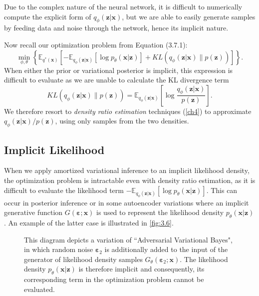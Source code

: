 \documentclass[honours,12pt, twoside]{unswthesis}
\newcommand{\E}{\mathbb{E}}
\numberwithin{equation}{section}
\theoremstyle{definition}
\begin{document}
Due to the complex nature of the neural network, it is difficult to numerically compute the explicit form of $q_\phi(\bm{z}|\bm{x})$, but we are able to easily generate samples by feeding data and noise through the network, hence its implicit nature.

Now recall our optimization problem from Equation (3.7.1):
\[\min_{\phi,\theta} \left\lbrace\mathbb{E}_{q^*(\bm{x})}\left[-\E_{q_\phi(\bm{z}|\bm{x})}[\log p_\theta(\bm{x}|\bm{z})]+KL(q_\phi(\bm{z}|\bm{x})\|p(\bm{z}))\right]\right\rbrace.\]
When either the prior or variational posterior is implicit, this expression is difficult to evaluate as we are unable to calculate the KL divergence term
\[KL(q_\phi(\bm{z}|\bm{x})\|p(\bm{z}))=\E_{q_\phi(\bm{z}|\bm{x})}\left[\log \frac{q_\phi(\bm{z}|\bm{x})}{p(\bm{z})}\right].\]
We therefore resort to \textit{density ratio estimation} techniques (\autoref{ch4}) to approximate $q_\phi(\bm{z}|\bm{x})/p(\bm{z})$, using only samples from the two densities.
\subsection{Implicit Likelihood}\label{sec:3.8.2}
When we apply amortized variational inference to an implicit likelihood density, the optimization problem is intractable even with density ratio estimation, as it is difficult to evaluate the likelihood term $-\E_{q_\phi(\bm{z}|\bm{x})}[\log p_\theta(\bm{x}|\bm{z})]$. This can occur in posterior inference or in some autoencoder variations where an implicit generative function $G(\bm{\varepsilon};\bm{x})$ is used to represent the likelihood density $p_\theta(\bm{x}|\bm{z})$ \citep{ali}. An example of the latter case is illustrated in \autoref{fig:3.6}.
\begin{figure}[h]
  \centering
   \caption{\small This diagram depicts a variation of ``Adversarial Variational Bayes", in which random noise $\bm{\varepsilon}_2$ is additionally added to the input of the generator of likelihood density samples $G_\theta(\bm{\varepsilon}_2;\bm{x})$. The likelihood density $p_\theta(\bm{x}|\bm{z})$ is therefore implicit and consequently, its corresponding term in the optimization problem cannot be evaluated.}
   \label{fig:3.6}
\end{figure}
\end{document}
